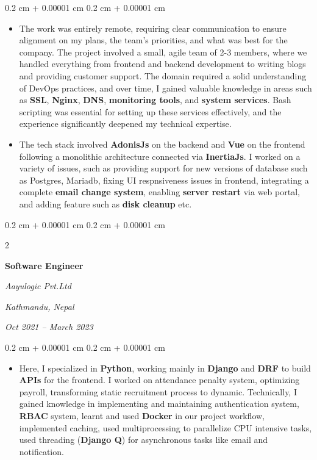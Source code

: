 \documentclass[10pt, letterpaper]{article}
\newenvironment{highlights}{
    \begin{itemize}[
        topsep=0.10 cm,
        parsep=0.10 cm,
        partopsep=0pt,
        itemsep=0pt,
        leftmargin=0.4 cm + 10pt
    ]
}{
    \end{itemize}
} %
\newenvironment{onecolentry}{
    \begin{adjustwidth}{
        0.2 cm + 0.00001 cm
    }{
        0.2 cm + 0.00001 cm
    }
}{
    \end{adjustwidth}
} %
\newenvironment{twocolentry}[2][]{
    \onecolentry
    \def\secondColumn{#2}
    \setcolumnwidth{\fill, 4.5 cm}
    \begin{paracol}{2}
}{
    \switchcolumn \raggedleft \secondColumn
    \end{paracol}
    \endonecolentry
} %
\begin{document}
        \vspace{0.10 cm}
        \begin{onecolentry}
            \begin{highlights}
            \item The work was entirely remote, requiring clear communication to ensure alignment on my plans, the team's priorities, and what was best for the company. The project involved a small, agile team of 2-3 members, where we handled everything from frontend and backend development to writing blogs and providing customer support. The domain required a solid understanding of DevOps practices, and over time, I gained valuable knowledge in areas such as \textbf{SSL}, \textbf{Nginx}, \textbf{DNS}, \textbf{monitoring tools}, and \textbf{system services}. Bash scripting was essential for setting up these services effectively, and the experience significantly deepened my technical expertise.

            \item The tech stack involved \textbf{AdonisJs} on the backend and \textbf{Vue} on the frontend following a monolithic architecture connected via \textbf{InertiaJs}. I worked on a variety of issues, such as providing support for new versions of database such as Postgres, Mariadb, fixing UI respnsiveness issues in frontend, integrating a complete \textbf{email change system}, enabling \textbf{server restart} via web portal, and adding feature such as \textbf{disk cleanup} etc. 
            \end{highlights}
        \end{onecolentry}


        \vspace{0.2 cm}

        \begin{twocolentry}{
        \textit{Kathmandu, Nepal}    
            
        \textit{Oct 2021 – March 2023}}
            \textbf{Software Engineer}
            
            \textit{Aayulogic Pvt.Ltd}
        \end{twocolentry}

        \vspace{0.10 cm}
        \begin{onecolentry}
            \begin{highlights}
            \item Here, I specialized in \textbf{Python}, working mainly in \textbf{Django} and \textbf{DRF} to build \textbf{APIs} for the frontend. I worked on attendance penalty system, optimizing payroll, transforming static recruitment process to dynamic. Technically, I gained knowledge in implementing and maintaining authentication system, \textbf{RBAC} system, learnt and used \textbf{Docker} in our project workflow, implemented caching, used multiprocessing to parallelize CPU intensive tasks, used threading (\textbf{Django Q}) for asynchronous tasks like email and notification. 
            \end{highlights}
        \end{onecolentry}
    
\end{document}
